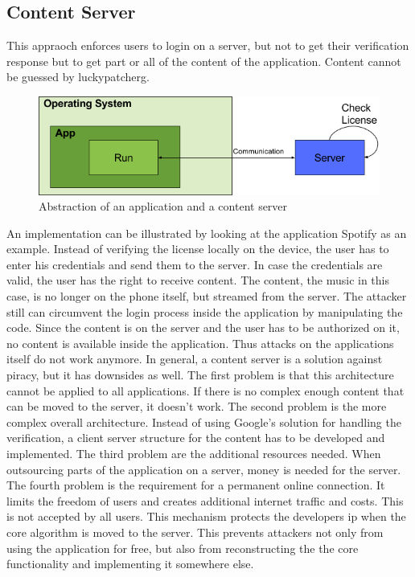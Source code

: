 \subsection{Content Server} \label{section:counter-replace-server}
This appraoch enforces users to login on a server, but not to get their verification response but to get part or all of the content of the application.
Content cannot be guessed by \gls{luckypatcherg}.
\newline
\begin{figure}[h]
    \centering
    \includegraphics[width=1\textwidth]{data/contentServer.png}
    \caption{Abstraction of an application and a content server}
    \label{fig:contentServer}
\end{figure}
An implementation can be illustrated by looking at the application Spotify \cite{spotify} as an example.
Instead of verifying the license locally on the device, the user has to enter his credentials and send them to the server.
In case the credentials are valid, the user has the right to receive content.
The content, the music in this case, is no longer on the phone itself, but streamed from the server.
The attacker still can circumvent the login process inside the application by manipulating the code.
Since the content is on the server and the user has to be authorized on it, no content is available inside the application.
Thus attacks on the applications itself do not work anymore.
\newline
\newline
In general, a content server is a solution against piracy, but it has downsides as well.
The first problem is that this architecture cannot be applied to all applications.
If there is no complex enough content that can be moved to the server, it doesn't work.
\newline
The second problem is the more complex overall architecture.
Instead of using Google's solution for handling the verification, a client server structure for the content has to be developed and implemented.
\newline
The third problem are the additional resources needed.
When outsourcing parts of the application on a server, money is needed for the server.
\newline
The fourth problem is the requirement for a permanent online connection.
It limits the freedom of users and creates additional internet traffic and costs.
This is not accepted by all users.
\newline
\newline
This mechanism protects the developers \gls{ip} when the core algorithm is moved to the server.
This prevents attackers not only from using the application for free, but also from reconstructing the the core functionality and implementing it somewhere else.
